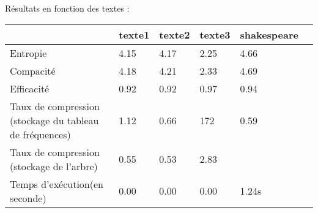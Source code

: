 \documentclass[a4paper,11pt]{article}
\begin{document}
\large Résultats en fonction des textes : \\
\begin{tabular}{|l|l|l|l|l|l}
\hline
 & texte1 & texte2 & texte3 & shakespeare \\
\hline
Entropie & 4.15 & 4.17 & 2.25 & 4.66 \\
Compacité & 4.18 & 4.21 & 2.33 & 4.69 \\
Efficacité & 0.92 & 0.92 & 0.97 & 0.94 \\
Taux de compression (stockage du tableau de fréquences) & 1.12 & 0.66 & 172 & 0.59 \\
Taux de compression (stockage de l'arbre) & 0.55  & 0.53  & 2.83  &   & \\
Temps d'exécution(en seconde) & 0.00 & 0.00 & 0.00 & 1.24s \\
\hline
\end{tabular}
\end{document}
